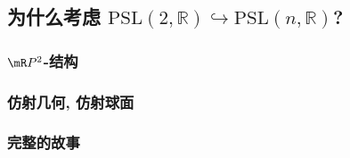 \subsection{为什么考虑 $\mathrm{PSL}(2,\mathbb{R})\hookrightarrow \mathrm{PSL}(n,\mathbb{R})$?}

\subsubsection{$\mR P^2$-结构}
\subsubsection{仿射几何, 仿射球面}
\subsubsection{完整的故事}